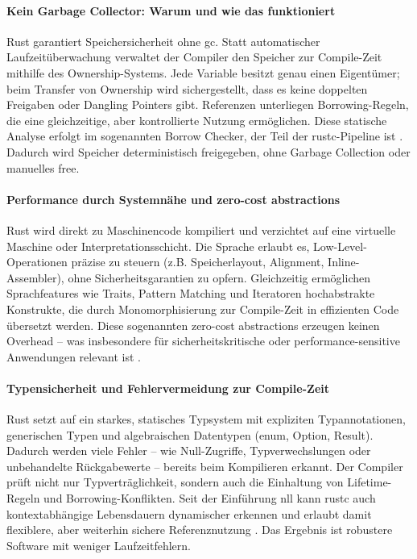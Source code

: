 \paragraph{Kein Garbage Collector: Warum und wie das funktioniert}
Rust garantiert Speichersicherheit ohne \ac{gc}. Statt automatischer Laufzeitüberwachung verwaltet der Compiler den Speicher zur Compile-Zeit mithilfe des Ownership-Systems. Jede Variable besitzt genau einen Eigentümer; beim Transfer von Ownership wird sichergestellt, dass es keine doppelten Freigaben oder Dangling Pointers gibt. Referenzen unterliegen Borrowing-Regeln, die eine gleichzeitige, aber kontrollierte Nutzung ermöglichen. Diese statische Analyse erfolgt im sogenannten Borrow Checker, der Teil der rustc-Pipeline ist \cite{mark-i-m2025}. Dadurch wird Speicher deterministisch freigegeben, ohne Garbage Collection oder manuelles free.

\paragraph{Performance durch Systemnähe und zero-cost abstractions}
Rust wird direkt zu Maschinencode kompiliert und verzichtet auf eine virtuelle Maschine oder Interpretationsschicht. Die Sprache erlaubt es, Low-Level-Operationen präzise zu steuern (z.B. Speicherlayout, Alignment, Inline-Assembler), ohne Sicherheitsgarantien zu opfern. Gleichzeitig ermöglichen Sprachfeatures wie Traits, Pattern Matching und Iteratoren hochabstrakte Konstrukte, die durch Monomorphisierung zur Compile-Zeit in effizienten Code übersetzt werden. Diese sogenannten zero-cost abstractions erzeugen keinen Overhead – was insbesondere für sicherheitskritische oder performance-sensitive Anwendungen relevant ist \cite{SteveKlabnik2024}.

\paragraph{Typensicherheit und Fehlervermeidung zur Compile-Zeit}
Rust setzt auf ein starkes, statisches Typsystem mit expliziten Typannotationen, generischen Typen und algebraischen Datentypen (enum, Option, Result). Dadurch werden viele Fehler – wie Null-Zugriffe, Typverwechslungen oder unbehandelte Rückgabewerte – bereits beim Kompilieren erkannt. Der Compiler prüft nicht nur Typverträglichkeit, sondern auch die Einhaltung von Lifetime-Regeln und Borrowing-Konflikten. Seit der Einführung \ac{nll} kann rustc auch kontextabhängige Lebensdauern dynamischer erkennen und erlaubt damit flexiblere, aber weiterhin sichere Referenznutzung \cite{Matsakis2022}. Das Ergebnis ist robustere Software mit weniger Laufzeitfehlern.

